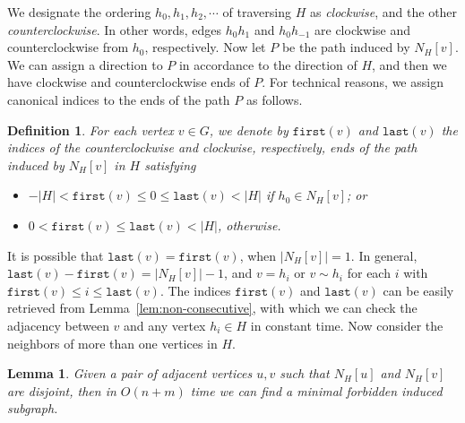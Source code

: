 \documentclass[10pt]{article}
\newtheorem{lemma}[theorem]{Lemma}
\newtheorem{definition}{Definition}
\newcommand{\badgraph}{minimal forbidden induced subgraph}
\newcommand{\hv}[1]{\ensuremath{N_H[#1]}}
\newcommand{\head}[1]{\ensuremath{{\mathtt{last}(#1)}}}
\newcommand{\tail}[1]{\ensuremath{{\mathtt{first}(#1)}}}
\begin{document}
We designate the ordering $h_0, h_1, h_2, \cdots$ of traversing $H$ as
\emph{clockwise}, and the other \emph{counterclockwise}.  In other
words, edges $h_0 h_{1}$ and $h_0 h_{-1}$ are clockwise and
counterclockwise from $h_0$, respectively.  Now let $P$ be the path
induced by $\hv{v}$.  We can assign a direction to $P$ in accordance
to the direction of $H$, and then we have clockwise and
counterclockwise ends of $P$.  For technical reasons, we assign
canonical indices to the ends of the path $P$ as follows.
\begin{definition}
  For each vertex $v\in G$, we denote by \tail{v} and \head{v} the
  indices of the counterclockwise and clockwise, respectively, ends of
  the path induced by \hv{v} in $H$ satisfying
  \begin{itemize}
  \item $- |H| < \tail{v} \le 0\le \head{v} < |H|$ {if } $h_0\in
    N_H[v]$; or
  \item $0< \tail{v}\le \head{v}< |H|$, {otherwise}.
  \end{itemize}
\end{definition}
It is possible that $\head{v} = \tail{v}$, when $|\hv{v}| = 1$.  In
general, $\head{v} - \tail{v} = |\hv{v}| - 1$, and $v=h_i$ or $v\sim
h_i$ for each $i$ with $\tail{v}\le i\le \head{v}$.  The indices
$\tail{v}$ and $\head{v}$ can be easily retrieved from
Lemma~\ref{lem:non-consecutive}, with which we can check the adjacency
between $v$ and any vertex $h_i\in H$ in constant time.  Now consider
the neighbors of more than one vertices in $H$.
\begin{lemma}\label{lem:non-consecutive-2}
  Given a pair of adjacent vertices $u,v$ such that $N_H[u]$ and
  $N_H[v]$ are disjoint, then in $O(n+m)$ time we can find a
  \badgraph.
\end{lemma}
\end{document}
